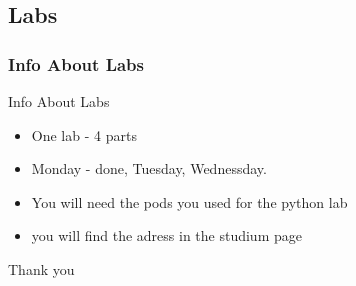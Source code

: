 \documentclass[aspectratio=169,usenames,dvipsnames]{beamer}
\begin{document}
\subsection{Labs}
\begin{frame}
    \frametitle{Info About Labs}
    \begin{block}{Info About Labs}
        \begin{itemize}
            \item One lab - 4 parts
            \item Monday - done, Tuesday, Wednessday. 
            \item You will need the pods you used for the python lab
            \item you will find the adress in the studium page
        \end{itemize}    
    \end{block}
\end{frame}

\begin{frame}[plain]
    \vfill\hfill{\Huge\qquad\color{white} \zB Thank \zC you}\hfill\hfill\hfill\vfill
\end{frame}
\end{document}
